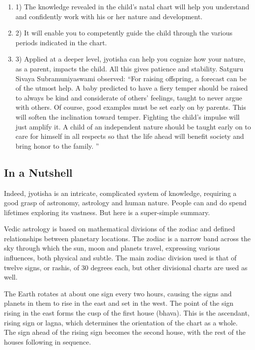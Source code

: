 \begin{enumerate}
\item[] 1) The knowledge revealed in the child’s natal chart will help you understand and confidently work with his or her nature and development.

\item[] 2) It will enable you to competently guide the child through the various periods indicated in the chart.

\item[] 3) Applied at a deeper level, jyotisha can help you cognize how your nature, as a parent, impacts the child. All this gives patience and stability. Satguru Sivaya Subramuniyaswami observed: “For raising offspring, a forecast can be of the utmost help. A baby predicted to have a fiery temper should be raised to always be kind and considerate of others’ feelings, taught to never argue with others. Of course, good examples must be set early on by parents. This will soften the inclination toward temper. Fighting the child’s impulse will just amplify it. A child of an independent nature should be taught early on to care for himself in all respects so that the life ahead will benefit society and bring honor to the family. ”
\end{enumerate}
 

\subsection{In a Nutshell}

Indeed, jyotisha is an intricate, complicated system of knowledge, requiring a good grasp of astronomy, astrology and human nature. People can and do spend lifetimes exploring its vastness. But here is a super-simple summary.

 

Vedic astrology is based on math­e­matical divisions of the zodiac and defined relationships between planetary locations. The zodiac is a narrow band across the sky through which the sun, moon and planets travel, expressing various influences, both physical and subtle. The main zodiac division used is that of twelve signs, or rashis, of 30 degrees each, but other divisional charts are used as well.

 

The Earth rotates at about one sign every two hours, causing the signs and planets in them to rise in the east and set in the west. The point of the sign rising in the east forms the cusp of the first house (bhava). This is the ascendant, rising sign or lagna, which determines the orientation of the chart as a whole. The sign ahead of the rising sign becomes the second house, with the rest of the houses following in sequence.

